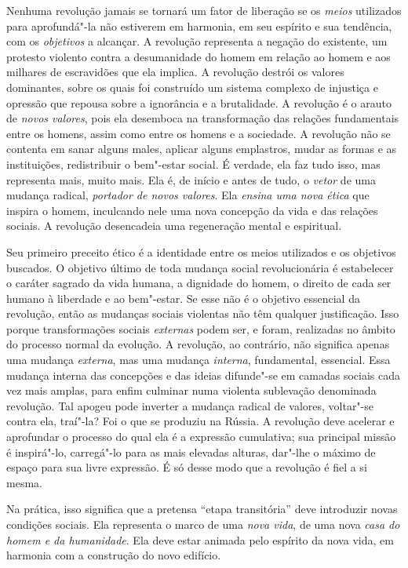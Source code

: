 Nenhuma revolução jamais se tornará um fator de liberação se os \textit{meios}
utilizados para aprofundá"-la não estiverem em harmonia, em seu
espírito e sua tendência, com os \textit{objetivos} a alcançar. A revolução
representa a negação do existente, um protesto violento contra a
desumanidade do homem em relação ao homem e aos milhares de escravidões
que ela implica. A revolução destrói os valores dominantes, sobre os
quais foi construído um sistema complexo de injustiça e opressão
que repousa sobre a ignorância e a brutalidade. A revolução é o arauto
de \textit{novos valores}, pois ela desemboca na transformação das relações
fundamentais entre os homens, assim como entre os homens e a sociedade.
A revolução não se contenta em sanar alguns males, aplicar alguns
emplastros, mudar as formas e as instituições, redistribuir o
bem"-estar social. É verdade, ela faz tudo isso, mas representa mais,
muito mais. Ela é, de início e antes de tudo, o \textit{vetor} de uma mudança
radical, \textit{portador de novos valores}. Ela \textit{ensina uma nova ética} que
inspira o homem, inculcando nele uma nova concepção da vida e das
relações sociais. A revolução desencadeia uma regeneração mental e
espiritual.

Seu primeiro preceito ético é a identidade entre os meios utilizados e
os objetivos buscados. O objetivo último de toda mudança social
revolucionária é estabelecer o caráter sagrado da vida humana, a
dignidade do homem, o direito de cada ser humano à liberdade e ao
bem"-estar. Se esse não é o objetivo essencial da revolução, então as
mudanças sociais violentas não têm qualquer justificação. Isso porque
transformações sociais \textit{externas} podem ser, e foram, realizadas no 
âmbito do processo normal da evolução. A revolução, ao contrário, não
significa apenas uma mudança \textit{externa}, mas uma mudança \textit{interna}, 
fundamental, essencial. Essa mudança interna das concepções e das
ideias difunde"-se em camadas sociais cada vez mais amplas, para
enfim culminar numa violenta sublevação denominada revolução. Tal
apogeu pode inverter a mudança radical de valores, voltar"-se contra
ela, traí"-la? Foi o que se produziu na Rússia. A revolução deve
acelerar e aprofundar o processo do qual ela é a expressão cumulativa;
sua principal missão é inspirá"-lo, carregá"-lo para as mais elevadas
alturas, dar"-lhe o máximo de espaço para sua livre expressão. É só
desse modo que a revolução é fiel a si mesma.

Na prática, isso significa que a pretensa “etapa transitória” deve
introduzir novas condições sociais. Ela representa o marco de uma \textit{nova
vida}, de uma nova \textit{casa do homem e da humanidade}. Ela deve estar animada
pelo espírito da nova vida, em harmonia com a construção do novo
edifício.

